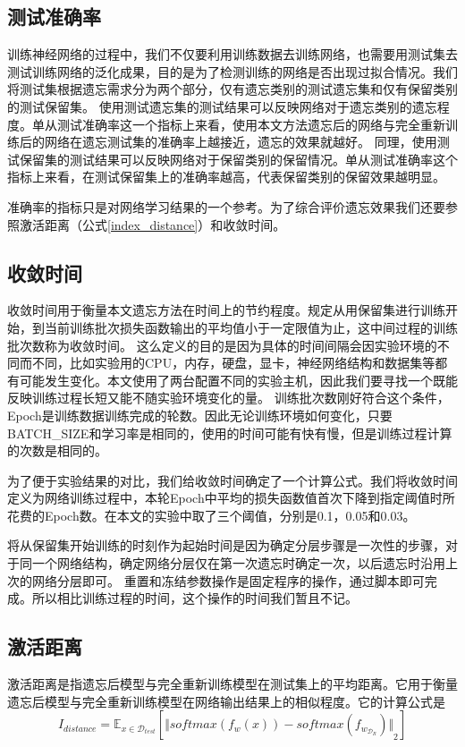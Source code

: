 \subsection{测试准确率}
训练神经网络的过程中，我们不仅要利用训练数据去训练网络，也需要用测试集去测试训练网络的泛化成果，目的是为了检测训练的网络是否出现过拟合情况。我们将测试集根据遗忘需求分为两个部分，仅有遗忘类别的测试遗忘集和仅有保留类别的测试保留集。
使用测试遗忘集的测试结果可以反映网络对于遗忘类别的遗忘程度。单从测试准确率这一个指标上来看，使用本文方法遗忘后的网络与完全重新训练后的网络在遗忘测试集的准确率上越接近，遗忘的效果就越好。
同理，使用测试保留集的测试结果可以反映网络对于保留类别的保留情况。单从测试准确率这个指标上来看，在测试保留集上的准确率越高，代表保留类别的保留效果越明显。

准确率的指标只是对网络学习结果的一个参考。为了综合评价遗忘效果我们还要参照激活距离（公式\ref{index_distance}）和收敛时间。

\subsection{收敛时间}
收敛时间用于衡量本文遗忘方法在时间上的节约程度。规定从用保留集进行训练开始，到当前训练批次损失函数输出的平均值小于一定限值为止，这中间过程的训练批次数称为收敛时间。
这么定义的目的是因为具体的时间间隔会因实验环境的不同而不同，比如实验用的CPU，内存，硬盘，显卡，神经网络结构和数据集等都有可能发生变化。本文使用了两台配置不同的实验主机，因此我们要寻找一个既能反映训练过程长短又能不随实验环境变化的量。
训练批次数刚好符合这个条件，Epoch是训练数据训练完成的轮数。因此无论训练环境如何变化，只要BATCH\_SIZE和学习率是相同的，使用的时间可能有快有慢，但是训练过程计算的次数是相同的。

为了便于实验结果的对比，我们给收敛时间确定了一个计算公式。我们将收敛时间定义为网络训练过程中，本轮Epoch中平均的损失函数值首次下降到指定阈值时所花费的Epoch数。在本文的实验中取了三个阈值，分别是0.1，0.05和0.03。

将从保留集开始训练的时刻作为起始时间是因为确定分层步骤是一次性的步骤，对于同一个网络结构，确定网络分层仅在第一次遗忘时确定一次，以后遗忘时沿用上次的网络分层即可。
重置和冻结参数操作是固定程序的操作，通过脚本即可完成。所以相比训练过程的时间，这个操作的时间我们暂且不记。

\subsection{激活距离}
激活距离是指遗忘后模型与完全重新训练模型在测试集上的平均距离。它用于衡量遗忘后模型与完全重新训练模型在网络输出结果上的相似程度。它的计算公式是
\begin{equation}
I_{distance} = {\mathbb{E}}_{x\in {\mathcal{D}_{test}}}[{\Vert softmax(f_w(x)) - softmax(f_{w_{\mathcal{D}_R}}) \Vert}_2 ] \label{index_distance}
\end{equation}


